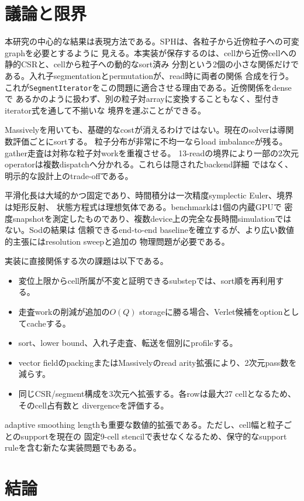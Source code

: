 \documentclass[a4paper,10pt]{ltjsarticle}
\newcommand{\code}[1]{\texttt{#1}}
\begin{document}
\section{議論と限界}

本研究の中心的な結果は表現方法である。SPHは、各粒子から近傍粒子への可変graphを必要とするように
見える。本実装が保存するのは、cellから近傍cellへの静的CSRと、cellから粒子への動的なsort済み
分割という2個の小さな関係だけである。入れ子segmentationとpermutationが、read時に両者の関係
合成を行う。これが\code{SegmentIterator}をこの問題に適合させる理由である。近傍関係をdenseで
あるかのように扱わず、別の粒子対arrayに変換することもなく、型付きiterator式を通して不揃いな
境界を運ぶことができる。

Massivelyを用いても、基礎的なcostが消えるわけではない。現在のsolverは導関数評価ごとにsortする。
粒子分布が非常に不均一ならload imbalanceが残る。gather走査は対称な粒子対workを重複させる。
13-readの境界により一部の2次元operatorは複数dispatchへ分かれる。これらは隠されたbackend詳細
ではなく、明示的な設計上のtrade-offである。

平滑化長は大域的かつ固定であり、時間積分は一次精度symplectic Euler、境界は矩形反射、
状態方程式は理想気体である。benchmarkは1個の内蔵GPUで
密度snapshotを測定したものであり、複数device上の完全な長時間simulationではない。Sodの結果は
信頼できるend-to-end baselineを確立するが、より広い数値的主張にはresolution sweepと追加の
物理問題が必要である。

実装に直接関係する次の課題は以下である。
\begin{itemize}
  \item 変位上限からcell所属が不変と証明できるsubstepでは、sort順を再利用する。
  \item 走査workの削減が追加の$O(Q)$ storageに勝る場合、Verlet候補をoptionとしてcacheする。
  \item sort、lower bound、入れ子走査、転送を個別にprofileする。
  \item vector fieldのpackingまたはMassivelyのread arity拡張により、2次元pass数を減らす。
  \item 同じCSR/segment構成を3次元へ拡張する。各rowは最大27 cellとなるため、そのcell占有数と
        divergenceを評価する。
\end{itemize}
adaptive smoothing lengthも重要な数値的拡張である。ただし、cell幅と粒子ごとのsupportを現在の
固定9-cell stencilで表せなくなるため、保守的なsupport ruleを含む新たな実装問題でもある。

\section{結論}
\end{document}
